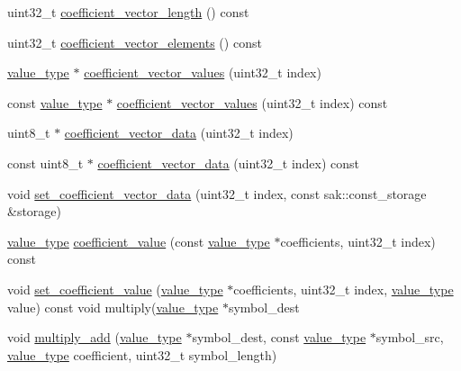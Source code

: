 \begin{DoxyCompactItemize}
uint32\-\_\-t \hyperlink{group__coefficient__storage__api_gaca30da6cd0d33efc5ac528eadd43147c}{coefficient\-\_\-vector\-\_\-length} () const 
\item 
uint32\-\_\-t \hyperlink{group__coefficient__storage__api_gab1e8bf505965d65dd3044f8d7067e82e}{coefficient\-\_\-vector\-\_\-elements} () const 
\item 
\hyperlink{classlayer_a3ad6d6930927932e5c25f2a2b5277cc0}{value\-\_\-type} $\ast$ \hyperlink{group__coefficient__storage__api_ga11529097f8883e4fd619ac1b85e496f6}{coefficient\-\_\-vector\-\_\-values} (uint32\-\_\-t index)
\item 
const \hyperlink{classlayer_a3ad6d6930927932e5c25f2a2b5277cc0}{value\-\_\-type} $\ast$ \hyperlink{group__coefficient__storage__api_gabbd848b3d62611d1b13da07755fb050a}{coefficient\-\_\-vector\-\_\-values} (uint32\-\_\-t index) const 
\item 
uint8\-\_\-t $\ast$ \hyperlink{group__coefficient__storage__api_gad15e1a9c3d9b24ffdf5e9d2915c03f44}{coefficient\-\_\-vector\-\_\-data} (uint32\-\_\-t index)
\item 
const uint8\-\_\-t $\ast$ \hyperlink{group__coefficient__storage__api_gae86412692c0a2384e3702a6504c3b911}{coefficient\-\_\-vector\-\_\-data} (uint32\-\_\-t index) const 
\item 
void \hyperlink{group__coefficient__storage__api_ga1cfc9696c66b278ce1e137f48a261601}{set\-\_\-coefficient\-\_\-vector\-\_\-data} (uint32\-\_\-t index, const sak\-::const\-\_\-storage \&storage)
\item 
\hyperlink{classlayer_a3ad6d6930927932e5c25f2a2b5277cc0}{value\-\_\-type} \hyperlink{classlayer_ad36e608f85e6fda4c81a610482924459}{coefficient\-\_\-value} (const \hyperlink{classlayer_a3ad6d6930927932e5c25f2a2b5277cc0}{value\-\_\-type} $\ast$coefficients, uint32\-\_\-t index) const 
\item 
void \hyperlink{group__finite__field__api_ga95ce95dd8b65fcaf7a35165472726d79}{set\-\_\-coefficient\-\_\-value} (\hyperlink{classlayer_a3ad6d6930927932e5c25f2a2b5277cc0}{value\-\_\-type} $\ast$coefficients, uint32\-\_\-t index, \hyperlink{classlayer_a3ad6d6930927932e5c25f2a2b5277cc0}{value\-\_\-type} value) const void multiply(\hyperlink{classlayer_a3ad6d6930927932e5c25f2a2b5277cc0}{value\-\_\-type} $\ast$symbol\-\_\-dest
\item 
void \hyperlink{group__finite__field__api_ga3d4a7a953b9c501745d857f293c4d39e}{multiply\-\_\-add} (\hyperlink{classlayer_a3ad6d6930927932e5c25f2a2b5277cc0}{value\-\_\-type} $\ast$symbol\-\_\-dest, const \hyperlink{classlayer_a3ad6d6930927932e5c25f2a2b5277cc0}{value\-\_\-type} $\ast$symbol\-\_\-src, \hyperlink{classlayer_a3ad6d6930927932e5c25f2a2b5277cc0}{value\-\_\-type} coefficient, uint32\-\_\-t symbol\-\_\-length)

\end{DoxyCompactItemize}
